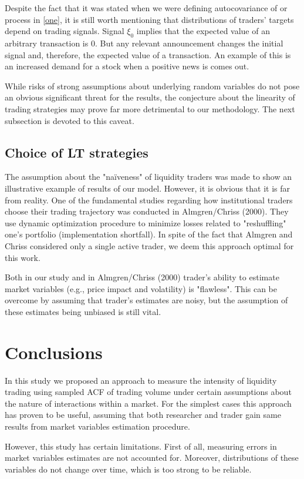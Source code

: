 \documentclass[12pt]{article}
\begin{document}
Despite the fact that it was stated when we were defining autocovariance of or process in \eqref{one}, it is still worth mentioning that distributions of traders' targets depend on trading signals. Signal $\xi_0$ implies that the expected value of an arbitrary transaction is 0. But any relevant announcement changes the initial signal and, therefore, the expected value of a transaction. An example of this is an increased demand for a stock when a positive news is comes out. 

While risks of strong assumptions about underlying random variables do not pose an obvious significant threat for the results, the conjecture about the linearity of trading strategies may prove far more detrimental to our methodology. The next subsection is devoted to this caveat.
\subsection{Choice of LT strategies}
The assumption about the "na\"iveness" of liquidity traders was made to show an illustrative example of results of our model. However, it is obvious that it is far from reality. One of the fundamental studies regarding how institutional traders choose their trading trajectory was conducted in Almgren/Chriss (2000). They use dynamic optimization procedure to minimize losses related to "reshuffling" one's portfolio (implementation shortfall). In spite of the fact that Almgren and Chriss considered only a single active trader, we deem this approach optimal for this work. 

Both in our study and in Almgren/Chriss (2000) trader's ability to estimate market variables (e.g., price impact and volatility) is "flawless". This can be overcome by assuming that trader's estimates are noisy, but the assumption of these estimates being unbiased is still vital.
\newpage

\section{Conclusions}\label{sec:concl}
In this study we proposed an approach to measure the intensity of liquidity trading using sampled ACF of trading volume under certain assumptions about the nature of interactions within a market. For the simplest cases this approach has proven to be useful, assuming that both researcher and trader gain same results from market variables estimation procedure.

However, this study has certain limitations. First of all, measuring errors in market variables estimates are not accounted for. Moreover, distributions of these variables do not change over time, which is too strong to be reliable. 
\end{document}
